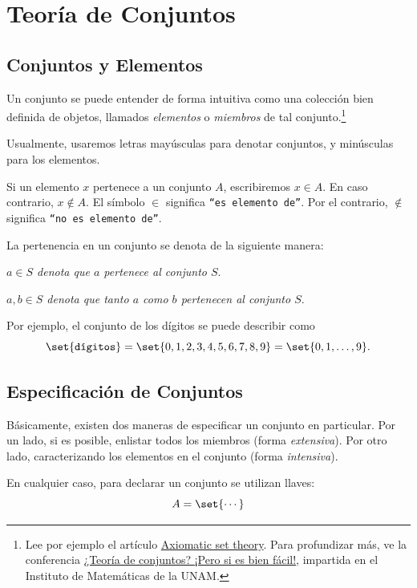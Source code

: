 \section{Teoría de Conjuntos}

\subsection{Conjuntos y Elementos}

	Un conjunto se puede entender de forma intuitiva como una colección bien definida de objetos, llamados \emph{elementos} o \emph{miembros} de tal conjunto.\footnote{Lee por ejemplo el artículo \href{https://www.britannica.com/science/set-theory/Axiomatic-set-theory}{Axiomatic set theory}. Para profundizar más, ve la conferencia \href{https://youtu.be/hLFit88zTYk}{¿Teoría de conjuntos? ¡Pero si es bien fácil!}, impartida en el Instituto de Matemáticas de la UNAM.}
	
	Usualmente, usaremos letras mayúsculas para denotar conjuntos, y minúsculas para los elementos. 

	Si un elemento $ x $ pertenece a un conjunto $ A $, escribiremos $ x\in A $. En caso contrario, $ x\not \in A $.
	El símbolo $\in$ significa \texttt{``es elemento de''}.  Por el contrario, $\notin$ significa \texttt{``no es elemento de''}.

	La pertenencia en un conjunto se denota de la siguiente manera:
	\begin{center}
		\emph{$a \in S$ denota que $a$ pertenece al conjunto $S.$} 
		
		\emph{$a,b \in S$ denota que tanto $a$ como $b$ pertenecen al conjunto $S.$}
	\end{center}
	
	Por ejemplo, el conjunto de los dígitos se puede describir como
	\[
		\set{\texttt{dígitos}}=\set{0,1,2,3,4,5,6,7,8,9}=\set{0,1,\dots,9}.
	\]

\subsection{Especificación de Conjuntos}

	Básicamente, existen dos maneras de especificar un conjunto en particular.  Por un lado, si es posible, enlistar todos los miembros (forma \emph{extensiva}).  Por otro lado, caracterizando los elementos en el conjunto (forma \emph{intensiva}).

	En cualquier caso, para declarar un conjunto se utilizan llaves:
	$$
	A=\set{\cdots}
	$$


